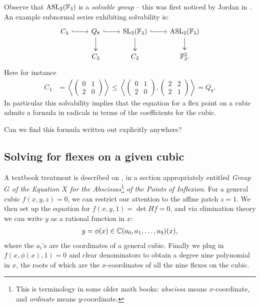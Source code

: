 \documentclass[11pt]{amsart}
\providecommand{\ASL}{\mathrm{ASL}}
\begin{document}
Observe that $\ASL_2(\F_3)$ is a \textit{solvable group} -- this was first noticed by Jordan in \cite[III.III\S1]{Jordan}. An example subnormal series exhibiting solvability is:
\[ \begin{tikzcd}
    C_4\rar[hook] & Q_8\rar[hook]\dar[two heads] & \SL_2(\F_3)\dar[two heads]\rar[hook] & \ASL_2(\F_3)\dar[two heads]\\
     & C_2 & C_2 & \F_3^2.
\end{tikzcd} \]
Here for instance
\begin{align*}
    C_4 &= \left\langle \begin{pmatrix} 0 & 1 \\ 2 & 0 \end{pmatrix}  \right\rangle \le \left\langle \begin{pmatrix} 0 & 1 \\ 2 & 0 \end{pmatrix}, \begin{pmatrix} 2 & 2 \\ 2 & 1 \end{pmatrix}  \right\rangle = Q_8.
\end{align*}
In particular this solvability implies that the equation for a flex point on a cubic admits a formula in radicals in terms of the coefficients for the cubic.

\begin{question} Can we find this formula written out explicitly anywhere?
\end{question}

\subsection{Solving for flexes on a given cubic}

A textbook treatment is described on \cite[p.~333]{MillerBlichfeldtDickson}, in a section appropriately entitled \emph{Group $G$ of the Equation $X$ for the Abscissas}\footnote{This is terminology in some older math books: \textit{abscissa} means $x$-coordinate, and \textit{ordinate} means $y$-coordinate.} \emph{of the Points of Inflexion}. For a general cubic $f(x,y,z)=0$, we can restrict our attention to the affine patch $z=1$. We then set up the equation for $f(x,y,1)=\det Hf = 0$, and via elimination theory we can write $y$ as a rational function in $x$:
\begin{align*}
    y = \phi(x) \in \mathbb{C}(a_0,a_1, \ldots, a_9)(x),
\end{align*}
where the $a_i$'s are the coordinates of a general cubic. Finally we plug in $f(x,\phi(x),1) =0$ and clear denominators to obtain a degree nine polynomial in $x$, the roots of which are the $x$-coordinates of all the nine flexes on the cubic.
\end{document}
